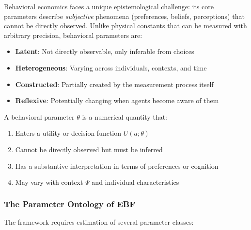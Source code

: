 Behavioral economics faces a unique epistemological challenge: its core parameters 
describe \textit{subjective} phenomena (preferences, beliefs, perceptions) that 
cannot be directly observed. Unlike physical constants that can be measured with 
arbitrary precision, behavioral parameters are:

\begin{itemize}
    \item \textbf{Latent}: Not directly observable, only inferable from choices
    \item \textbf{Heterogeneous}: Varying across individuals, contexts, and time
    \item \textbf{Constructed}: Partially created by the measurement process itself
    \item \textbf{Reflexive}: Potentially changing when agents become aware of them
\end{itemize}

\begin{definition}
\label{def:behavioral-parameter}
A behavioral parameter $\theta$ is a numerical quantity that:
\begin{enumerate}
    \item Enters a utility or decision function $U(a; \theta)$
    \item Cannot be directly observed but must be inferred
    \item Has a substantive interpretation in terms of preferences or cognition
    \item May vary with context $\Psi$ and individual characteristics
\end{enumerate}
\end{definition}

\subsubsection{The Parameter Ontology of EBF}

The framework requires estimation of several parameter classes:

